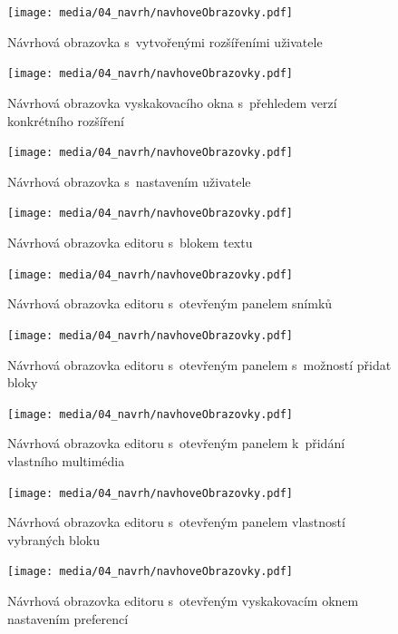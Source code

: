 \begin{figure}[ht!]
    \centering
    \texttt{[image: media/04\_navrh/navhoveObrazovky.pdf]}
    \caption{Návrhová obrazovka s~vytvořenými rozšířeními uživatele}
\end{figure}

\begin{figure}[ht!]
    \centering
    \texttt{[image: media/04\_navrh/navhoveObrazovky.pdf]}
    \caption{Návrhová obrazovka vyskakovacího okna s~přehledem verzí konkrétního rozšíření}
\end{figure}


\begin{figure}[ht!]
    \centering
    \texttt{[image: media/04\_navrh/navhoveObrazovky.pdf]}
    \caption{Návrhová obrazovka s~nastavením uživatele}
\end{figure}

\begin{figure}[ht!]
    \centering
    \texttt{[image: media/04\_navrh/navhoveObrazovky.pdf]}
    \caption{Návrhová obrazovka editoru s~blokem textu}
\end{figure}

\begin{figure}[ht!]
    \centering
    \texttt{[image: media/04\_navrh/navhoveObrazovky.pdf]}
    \caption{Návrhová obrazovka editoru s~otevřeným panelem snímků}
\end{figure}


\begin{figure}[ht!]
    \centering
    \texttt{[image: media/04\_navrh/navhoveObrazovky.pdf]}
    \caption{Návrhová obrazovka editoru s~otevřeným panelem s~možností přidat bloky}
\end{figure}


\begin{figure}[ht!]
    \centering
    \texttt{[image: media/04\_navrh/navhoveObrazovky.pdf]}
    \caption{Návrhová obrazovka editoru s~otevřeným panelem k~přidání vlastního multimédia}
\end{figure}


\begin{figure}[ht!]
    \centering
    \texttt{[image: media/04\_navrh/navhoveObrazovky.pdf]}
    \caption{Návrhová obrazovka editoru s~otevřeným panelem vlastností vybraných bloku}
\end{figure}


\begin{figure}[ht!]
    \centering
    \texttt{[image: media/04\_navrh/navhoveObrazovky.pdf]}
    \caption{Návrhová obrazovka editoru s~otevřeným vyskakovacím oknem nastavením preferencí}
\end{figure}

